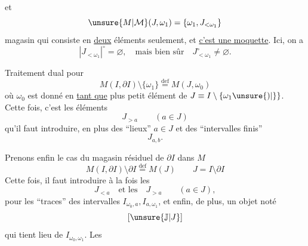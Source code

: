 
et
\[
\unsure{M|\mathcal M}(J,\omega_1)=\{\omega_1,J_{<\omega_1}\}
\]
magasin qui consiste en \uline{deux} éléments seulement, et \uline{c'est une moquette}. Ici, on a
\[
|J_{<\omega_1}|^{\circ}=\varnothing,\quad\text{mais bien sûr}\quad J^{\circ}_{<\omega_1}\neq\varnothing.
\]

 Traitement dual pour
\[
M(I,\partial I)\setminus\{\omega_1\}\overset{\mathrm{def}}=M(J,\omega_0)
\]
où $\omega_0$ est donné en \uline{tant que} plus petit élément de $J\equiv I\setminus\{\omega_1\unsure{)|\}}$. Cette fois, c'est les éléments
\[
J_{>a}\qquad(a\in J)
\]
qu'il faut introduire, en plus des ``lieux'' $a\in J$ et des ``intervalles finis'' 
\[
J_{a,b}.
\]

Prenons enfin le cas du magasin résiduel de $\partial I$ dans $M$
\[
M(I,\partial I)\setminus\partial I\overset{\mathrm{def}}=M(J)\qquad J=I\setminus\partial I
\]
Cette fois, il faut introduire à la fois les
\[
J_{<a}\quad\text{et les}\quad J_{>a}\qquad(a\in J),
\]
pour les ``traces'' des intervalles  $I_{\omega_0,a},I_{a,\omega_1}$, et  enfin, de plus, un objet noté
\[
[\unsure{\mathbb J|J}]
\]
qui tient lieu de $I_{\omega_0,\omega_1}$. Les 
